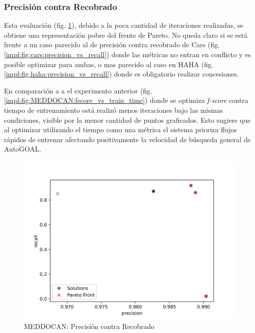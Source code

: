 \subsubsection{Precisi\'on contra Recobrado}
Esta evaluaci\'on (fig. \ref{impl:fig:MEDDOCAN:precision_vs_recall}), debido a la poca cantidad de iteraciones realizadas, se obtiene una representaci\'on pobre del frente de Pareto. No queda claro si se est\'a frente a un caso parecido al de precisi\'on contra recobrado de Cars (fig. \ref{impl:fig:cars:precision_vs_recall}) donde las m\'etricas no entran en conflicto y es posible optimizar para ambas, o mas parecido al caso en HAHA (fig. \ref{impl:fig:haha:precision_vs_recall}) donde es obligatorio realizar concesiones.

En comparaci\'on a a el experimento anterior (fig. \ref{impl:fig:MEDDOCAN:fscore_vs_train_time}) donde se optimiza \textit{f-score} contra tiempo de entrenamiento est\'a realiz\'o menos iteraciones bajo las mismas condiciones, visible por la menor cantidad de puntos graficados. Esto sugiere que al optimizar utilizando el tiempo como una m\'etrica el sistema prioriza flujos r\'apidos de entrenar afectando positivamente la velocidad de b\'usqueda general de AutoGOAL.

\begin{figure}[ht]
    \centering
    \includegraphics[scale=0.65]{Pictures/meddocan_precision_vs_recall.jpg}
    \caption{MEDDOCAN: Precisi\'on contra Recobrado}
    \label{impl:fig:MEDDOCAN:precision_vs_recall}
\end{figure}
